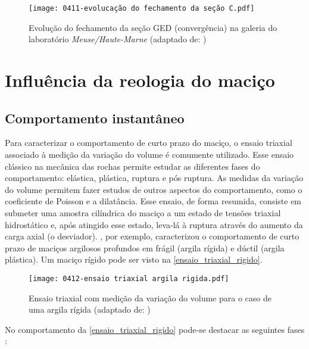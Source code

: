 \begin{figure}[H]
	\begin{center}
		\texttt{[image: 0411-evolucação do fechamento da seção C.pdf]}
	\end{center}
	\caption{\label{evolucao_GED}Evolução do fechamento da seção GED (convergência) na galeria do laboratório \textit{Meuse/Haute-Marne}  (adaptado de: )}
\end{figure}



\section{Influência da reologia do maciço}

\subsection{Comportamento instantâneo}

Para caracterizar o comportamento de curto prazo do maciço, o ensaio triaxial associado à medição da variação do volume é comumente utilizado. Esse ensaio clássico na mecânica das rochas permite estudar as diferentes fases do comportamento: elástica, plástica, ruptura e pós ruptura. As medidas da variação do volume permitem fazer estudos de outros aspectos do comportamento, como o coeficiente de Poisson e a dilatância. Esse ensaio, de forma resumida, consiste em submeter uma amostra cilíndrica do maciço a um estado de tensões triaxial hidrostático e, após atingido esse estado, leva-lá à ruptura através do aumento da carga axial (o desviador). , por exemplo, caracterizou o comportamento de curto prazo de maciços argilosos profundos em frágil (argila rígida) e dúctil (argila plástica). Um maciço rígido pode ser visto na \autoref{ensaio_triaxial_rigido}.

\begin{figure}[H]
	\begin{center}
		\texttt{[image: 0412-ensaio triaxial argila rigida.pdf]}
	\end{center}
	\caption{\label{ensaio_triaxial_rigido}Ensaio triaxial com medição da variação do volume para o caso de uma argila rígida  (adaptado de: )}
\end{figure}

No comportamento da \autoref{ensaio_triaxial_rigido} pode-se destacar as seguintes fases \cite[p. 34]{Rousset1988}:

